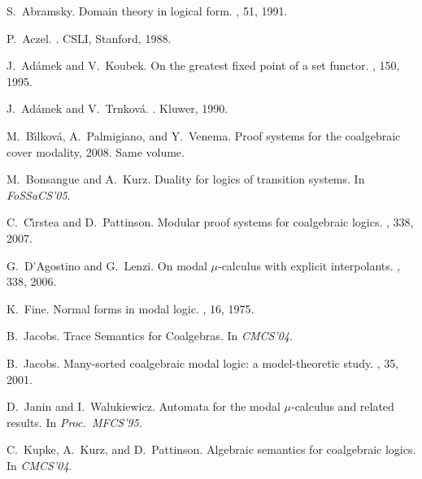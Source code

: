 \documentclass{book}
\begin{document}


% 

\begin{thebibliography}{10}

S.~Abramsky.
\newblock Domain theory in logical form.
, 51, 1991.

P.~Aczel.
.
\newblock CSLI, Stanford, 1988.

J.~Ad{\'a}mek and V.~Koubek.
\newblock On the greatest fixed point of a set functor.
, 150, 1995.

J.~Ad{\'a}mek and V.~Trnkov{\'a}.
.
\newblock Kluwer, 1990.

M.~B\'{\i}lkov\'a, A.~Palmigiano, and Y.~Venema.
\newblock Proof systems for the coalgebraic cover modality, 2008.
\newblock Same volume.

M.~Bonsangue and A.~Kurz.
\newblock Duality for logics of transition systems.
\newblock In {\em FoSSaCS'05}.

C.~C{\^\i}rstea and D.~Pattinson.
\newblock Modular proof systems for coalgebraic logics.
, 338, 2007.

G.~D'Agostino and G.~Lenzi.
\newblock On modal $\mu$-calculus with explicit interpolants.
, 338, 2006.

K.~Fine.
\newblock Normal forms in modal logic.
, 16, 1975.

B.~Jacobs.
\newblock Trace {S}emantics for {C}oalgebras.
\newblock In {\em CMCS'04}.

B.~Jacobs.
\newblock Many-sorted coalgebraic modal logic: a model-theoretic study.
, 35, 2001.

D.~Janin and I.~Walukiewicz.
\newblock Automata for the modal $\mu$-calculus and related results.
\newblock In {\em Proc.~MFCS'95}.

C.~Kupke, A.~Kurz, and D.~Pattinson.
\newblock Algebraic semantics for coalgebraic logics.
\newblock In {\em CMCS'04}.


\end{thebibliography}
\end{document}
